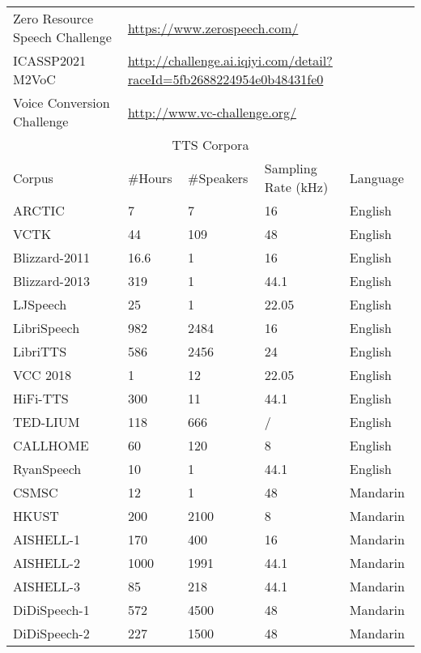 \documentclass{article}
\begin{document}
\begin{center}
\begin{longtable}{l l l l l}
Zero Resource Speech Challenge & \multicolumn{4}{p{9.5cm}}{\url{https://www.zerospeech.com/}} \\
ICASSP2021 M2VoC & \multicolumn{4}{p{9.5cm}}{\url{http://challenge.ai.iqiyi.com/detail?raceId=5fb2688224954e0b48431fe0}} \\
Voice Conversion Challenge & \multicolumn{4}{p{9.5cm}}{\url{http://www.vc-challenge.org/}} \\
\bottomrule 
\toprule
\multicolumn{5}{c}{\small  TTS Corpora} \\
\midrule
Corpus & \#Hours & \#Speakers & Sampling Rate (kHz)  & Language\\
\midrule
ARCTIC~\cite{kominek2003cmu}   & 7  & 7   & 16 & English \\
VCTK~\cite{veaux2016superseded}   & 44 & 109 & 48 & English \\
Blizzard-2011~\cite{king2011blizzard} & 16.6 & 1 & 16 & English \\
Blizzard-2013~\cite{king2013blizzard}  & 319 & 1 & 44.1 &  English \\
LJSpeech~\cite{ljspeech17} & 25 & 1 & 22.05 & English\\
LibriSpeech~\cite{panayotov2015librispeech} & 982 & 2484 & 16  & English \\
LibriTTS~\cite{zen2019libritts}  & 586 & 2456 & 24 & English\\
VCC 2018~\cite{lorenzo2018voice}   & 1  & 12 & 22.05 & English \\
HiFi-TTS~\cite{bakhturina2021hi} & 300 & 11 & 44.1 & English \\
TED-LIUM~\cite{rousseau2012ted} & 118 & 666 & / & English \\
CALLHOME~\cite{callhome} & 60 & 120 & 8 & English \\
RyanSpeech~\cite{Zandie2021ryanspeech} &10 & 1& 44.1& English \\
CSMSC~\cite{databaker2017}   & 12 & 1  & 48 & Mandarin \\
HKUST~\cite{liu2006hkust}   & 200 & 2100 & 8 & Mandarin \\
AISHELL-1~\cite{bu2017aishell}  &170 &400 & 16 & Mandarin \\
AISHELL-2~\cite{du2018aishell} &1000 &1991 & 44.1 & Mandarin \\
AISHELL-3~\cite{shi2020aishell}  &85 &218 & 44.1 & Mandarin \\
DiDiSpeech-1~\cite{guo2020didispeech} &572 & 4500 & 48 & Mandarin \\
DiDiSpeech-2~\cite{guo2020didispeech} &227 & 1500 & 48 & Mandarin \\

\end{longtable}
\end{center}
\end{document}
